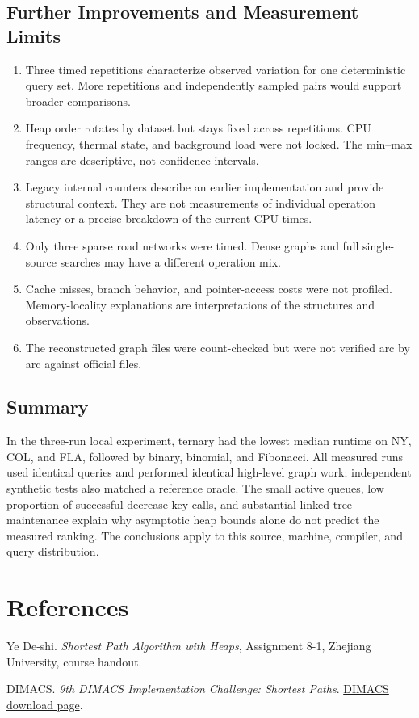 \documentclass[12pt,a4paper]{report}
\begin{document}
\section{Further Improvements and Measurement Limits}
\begin{enumerate}
  \item Three timed repetitions characterize observed variation for one
        deterministic query set. More repetitions and independently sampled
        pairs would support broader comparisons.
  \item Heap order rotates by dataset but stays fixed across repetitions.
        CPU frequency, thermal state, and background load were not locked.
        The min--max ranges are descriptive, not confidence intervals.
  \item Legacy internal counters describe an earlier implementation and
        provide structural context. They are not measurements of individual
        operation latency or a precise breakdown of the current CPU times.
  \item Only three sparse road networks were timed. Dense graphs and full
        single-source searches may have a different operation mix.
  \item Cache misses, branch behavior, and pointer-access costs were not
        profiled. Memory-locality explanations are interpretations of the
        structures and observations.
  \item The reconstructed graph files were count-checked but were not
        verified arc by arc against official files.
\end{enumerate}

\section{Summary}
In the three-run local experiment, ternary had the lowest median runtime on
NY, COL, and FLA, followed by binary, binomial, and Fibonacci. All measured
runs used identical queries and performed identical high-level graph work;
independent synthetic tests also matched a reference oracle.
The small active queues, low proportion of successful decrease-key calls,
and substantial linked-tree maintenance explain why asymptotic heap bounds
alone do not predict the measured ranking. The conclusions apply to this
source, machine, compiler, and query distribution.

\chapter*{References}
\begin{enumerate}[label={[\arabic*]}]
  \item Ye De-shi. \textit{Shortest Path Algorithm with Heaps}, Assignment
        8-1, Zhejiang University, course handout.
  \item DIMACS. \textit{9th DIMACS Implementation Challenge: Shortest Paths}.
        \href{https://www.diag.uniroma1.it/challenge9/download.shtml}{DIMACS download page}.
\end{enumerate}
\end{document}
